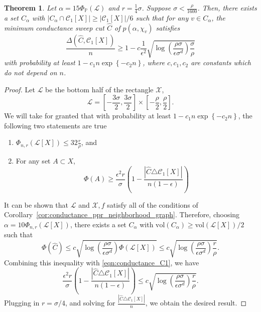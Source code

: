 \documentclass{article}
\newcommand{\abs}[1]{\left \lvert #1 \right \rvert}
\newcommand{\vol}{\mathrm{vol}}
\newcommand{\set}[1]{\left\{#1\right\}}
\newcommand{\Pbb}{\mathbb{P}}
\newcommand{\1}{\mathbf{1}}
\theoremstyle{alden}
\theoremstyle{aldenthm}
\newtheorem{theorem}{Theorem}
\theoremstyle{remark}
\begin{document}
\begin{theorem}
	Let $\alpha = 15\Phi_{\Pbb}(\mathcal{L})$ and $r = \frac{1}{4}\sigma$. Suppose $\sigma < \frac{\rho}{1600}$. Then, there exists a set $C_{\alpha}$ with $\abs{C_{\alpha} \cap \mathcal{C}_1[X]} \geq \abs{\mathcal{C}_1[X]}/6$ such that for any $v \in C_{\alpha}$, the minimum conductance sweep cut $\widehat{C}$ of $p(\alpha,\chi_v)$ satisfies
	\begin{equation*}
	\frac{\Delta(\widehat{C},\mathcal{C}_1[X])}{n} \geq 1 - c \frac{1}{\epsilon^2} \sqrt{\log\left(\frac{\rho \sigma}{\epsilon\sigma^d}\right)\frac{\sigma}{\rho}}
	\end{equation*}
	with probability at least $1 - c_1 n \exp\set{-c_2n}$, where $c, c_1,c_2$ are constants which do not depend on $n$.
\end{theorem}
\begin{proof}
	Let $\mathcal{L}$ be the bottom half of the rectangle $\mathcal{X}$,
	\begin{equation*}
	\mathcal{L} = \left[-\frac{3\sigma}{2}, \frac{3\sigma}{2}\right] \times \left[-\frac{\rho}{2},\frac{\rho}{2}\right].
	\end{equation*}
	We will take for granted that with probability at least $1 - c_1 n \exp\set{-c_2n}$, the following two statements are true
	\begin{enumerate}
		\item $\Phi_{n,r}(\mathcal{L}[X]) \leq 32 \frac{r}{\rho}$, and
		\item For any set $A \subset X$,
		\begin{equation}
		\label{eqn:conductance_C1}
		\Phi(A) \geq \frac{\epsilon^2 r}{\sigma}\left(1 - \frac{\abs{\widehat{C} \triangle \mathcal{C}_1[X]}}{n(1 - \epsilon)}\right)
		\end{equation}
	\end{enumerate}
	It can be shown that $\mathcal{L}$ and $\mathcal{X},f$ satisfy all of the conditions of Corollary~\ref{cor:conductance_ppr_neighborhood_graph}. Therefore, choosing $\alpha = 10 \Phi_{n,r}(\mathcal{L}[X])$, there exists a set $C_{\alpha}$ with $\vol(C_{\alpha}) \geq \vol(\mathcal{L}[X])/2$ such that 
	\begin{equation*}
	\Phi(\widehat{C}) \leq c \sqrt{\log\left(\frac{\rho \sigma}{\epsilon\sigma^d}\right) \Phi(\mathcal{L}[X])} \leq c \sqrt{\log\left(\frac{\rho \sigma}{\epsilon\sigma^d}\right) \frac{r}{\rho}}.
	\end{equation*}
	Combining this inequality with \eqref{eqn:conductance_C1}, we have
	\begin{equation*}
	\frac{\epsilon^2 r}{\sigma}\left(1 - \frac{\abs{\widehat{C} \triangle \mathcal{C}_1[X]}}{n(1 - \epsilon)}\right) \leq c \sqrt{\log\left(\frac{\rho \sigma}{\epsilon\sigma^d}\right) \frac{r}{\rho}}.
	\end{equation*}
	Plugging in $r = \sigma/4$, and solving for $\frac{\abs{\widehat{C} \triangle \mathcal{C}_1[X]}}{n}$, we obtain the desired result.
\end{proof}
\end{document}
